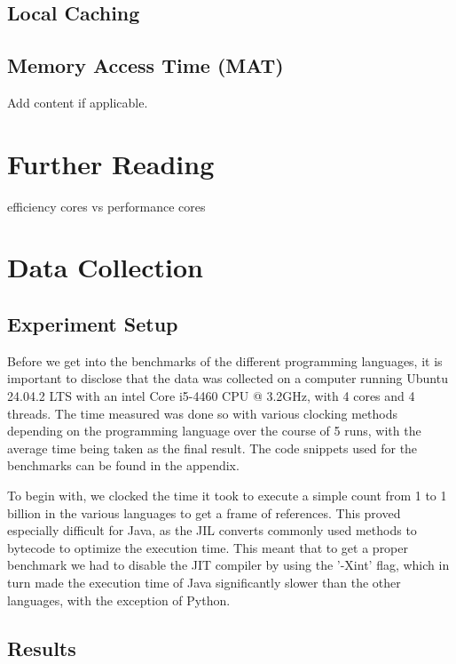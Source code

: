 \documentclass[12pt,a4paper]{article}
\begin{document}
\subsection{Local Caching}

\subsection{Memory Access Time (MAT)}

Add content if applicable.

\section{Further Reading}

efficiency cores vs performance cores

\section{Data Collection}

\subsection{Experiment Setup}

Before we get into the benchmarks of the different programming languages, it is important to disclose that the data was collected on a computer running Ubuntu 24.04.2 LTS with an intel Core i5-4460 CPU @ 3.2GHz, with 4 cores and 4 threads. The time measured was done so with various clocking methods depending on the programming language over the course of 5 runs, with the average time being taken as the final result. The code snippets used for the benchmarks can be found in the appendix.

To begin with, we clocked the time it took to execute a simple count from 1 to 1 billion in the various languages to get a frame of references. This proved especially difficult for Java, as the JIL converts commonly used methods to bytecode to optimize the execution time. This meant that to get a proper benchmark we had to disable the JIT compiler by using the '-Xint' flag, which in turn made the execution time of Java significantly slower than the other languages, with the exception of Python.

\newpage
\subsection{Results}
\end{document}
